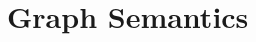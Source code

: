 \documentclass{article}
\begin{document}
\begin{definition}
\begin{multicols}{2}
          \end{multicols}
      \end{definition}

    \section{Graph Semantics}
\end{document}
